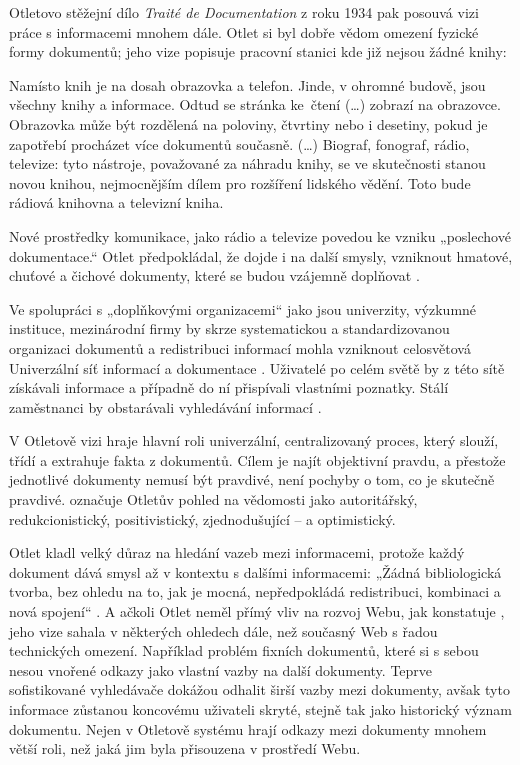 Otletovo stěžejní dílo \textit{Traité de Documentation} z roku 1934 pak posouvá vizi práce s informacemi mnohem dále. Otlet si byl dobře vědom omezení fyzické formy dokumentů; jeho vize popisuje pracovní stanici kde již nejsou žádné knihy:

\begin{quoted}{\autocite[Cit. podle][185]{Wright2007}}
Namísto knih je na dosah obrazovka a telefon. Jinde, v ohromné budově, jsou všechny knihy a informace. Odtud se stránka ke~čtení (…) zobrazí na obrazovce. Obrazovka může být rozdělená na poloviny, čtvrtiny nebo i desetiny, pokud je zapotřebí procházet více dokumentů současně. (…) Biograf, fonograf, rádio, televize: tyto nástroje, považované za náhradu knihy, se ve skutečnosti stanou novou knihou, nejmocnějším dílem pro rozšíření lidského vědění. Toto bude rádiová knihovna a televizní kniha.
\end{quoted}

Nové prostředky komunikace, jako rádio a televize povedou ke vzniku „poslechové dokumentace.“ Otlet předpokládal, že dojde i na další smysly, vzniknout hmatové, chuťové a čichové dokumenty, které se budou vzájemně doplňovat \autocite[244]{Rayward1994}.

Ve spolupráci s „doplňkovými organizacemi“ jako jsou univerzity, výzkumné instituce, mezinárodní firmy by skrze systematickou a standardizovanou organizaci dokumentů a redistribuci informací mohla vzniknout celosvětová Univerzální síť informací a dokumentace \autocite[246]{Rayward1994}. Uživatelé po celém světě by z této sítě získávali informace a případně do ní přispívali vlastními poznatky. Stálí zaměstnanci by obstarávali vyhledávání informací \autocite[191]{Wright2007}.

V Otletově vizi hraje hlavní roli univerzální, centralizovaný proces, který slouží, třídí a extrahuje fakta z dokumentů. Cílem je najít objektivní pravdu, a přestože jednotlivé dokumenty nemusí být pravdivé, není pochyby o tom, co je skutečně pravdivé. \Textcite[247]{Rayward1994} označuje Otletův pohled na vědomosti jako autoritářský, redukcionistický, positivistický, zjednodušující – a optimistický.

Otlet kladl velký důraz na hledání vazeb mezi informacemi, protože každý dokument dává smysl až v kontextu s dalšími informacemi: „Žádná bibliologická tvorba, bez ohledu na to, jak je mocná, nepředpokládá redistribuci, kombinaci a nová spojení“ \autocite[190]{Wright2007}.
A ačkoli Otlet neměl přímý vliv na rozvoj Webu, jak konstatuje \textcite[191]{Wright2007}, jeho vize sahala v některých ohledech dále, než současný Web s řadou technických omezení. Například problém fixních dokumentů, které si s sebou nesou vnořené odkazy jako vlastní vazby na další dokumenty. Teprve sofistikované vyhledávače dokážou odhalit širší vazby mezi dokumenty, avšak tyto informace zůstanou koncovému uživateli skryté, stejně tak jako historický význam dokumentu. Nejen v Otletově systému hrají odkazy mezi dokumenty mnohem větší roli, než jaká jim byla přisouzena v prostředí Webu.

